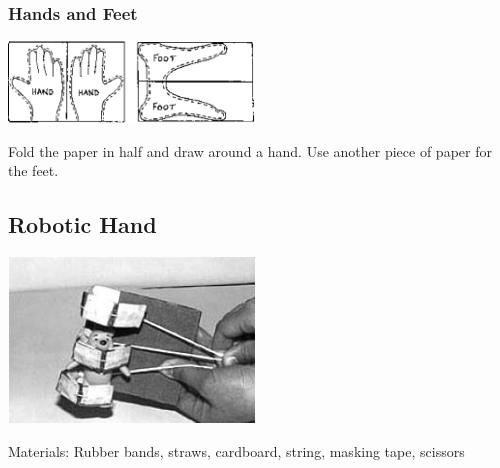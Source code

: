 \begin{multicols}{2}
\subsubsection{Hands and Feet}

\begin{center}
\includegraphics[width=0.49\textwidth]{./img/source/skeleton-hands-feet.png}
\end{center}
Fold the paper in half and draw around a hand. Use
another piece of paper for the feet.

\subsection{Robotic Hand}

\begin{center}
\includegraphics[width=0.49\textwidth]{./img/robotic-hand-use.jpg}
\end{center}

\begin{description*}
\item[Materials:]{Rubber bands, straws, cardboard, string, masking tape, scissors}
\end{description*}


\end{multicols}
